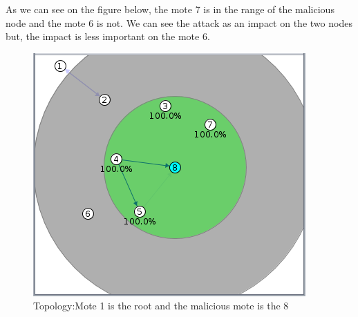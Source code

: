 \documentclass{report}
\begin{document}
As we can see on the figure below, the mote 7 is in the range of the malicious node and the mote
6 is not. We can see the attack as an impact on the two nodes but, the impact is less important
on the mote 6.


\begin{figure}[ht!]
\centering
\includegraphics[scale=0.55]{img/simulation_measurement}
\caption{Topology:Mote 1 is the root and the malicious mote is the 8}
\end{figure}
\end{document}
